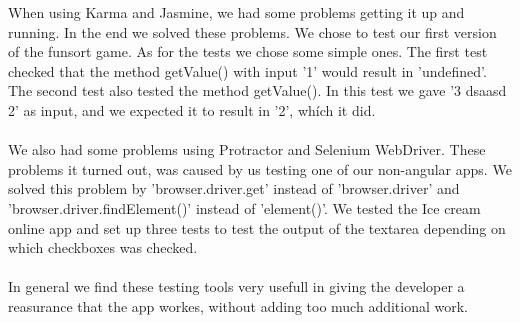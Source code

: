 When using Karma and Jasmine, we had some problems getting it up and running. In the end we solved these problems.
We chose to test our first version of the funsort game. 
As for the tests we chose some simple ones. The first test checked that the method getValue() with input '1' would result in 'undefined'. The second test also tested the method getValue(). In this test we gave '3 dsaasd 2' as input, and we expected it to result in '2', whích it did.
\\
\\
We also had some problems using Protractor and Selenium WebDriver. These problems it turned out, was caused by us testing one of our non-angular apps. We solved this problem by 'browser.driver.get' instead of 'browser.driver' and 'browser.driver.findElement()' instead of 'element()'.
We tested the Ice cream online app and set up three tests to test the output of the textarea depending on which checkboxes was checked.
\\
\\
In general we find these testing tools very usefull in giving the developer a reasurance that the app workes, without adding too much additional work.